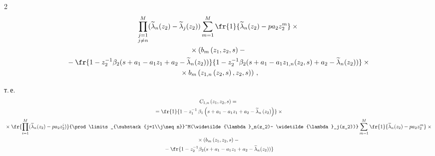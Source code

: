 \begin{multicols}{2}
\begin{multline*}
{\prod\limits_{\substack{j=1\\j\neq n}}^M(\widetilde{\lambda}_n(z_2)-


\widetilde{\lambda}_j(z_2))}


\sum\limits_{m=1}^M


\fr{1}{\widetilde{\lambda}_n(z_2)-pa_2 z_2^m}\times{}\\


{}\times\left(b_m\left(z_1,z_2,s\right)-{}\right.\\


{}-


\fr{1-z_2^{-1}\beta_2(s+a_1-a_1 z_1+a_2-\widetilde{\lambda}_n(z_2))}


{1-z_2^{-1}\beta_2(s+a_1-a_1 z_{1,n}(z_2,s)+a_2-\widetilde{\lambda}_n(z_2))}\times{}\\


\left.{}\times b_m\left(z_{1,n}\left(z_2,s\right),z_2,s\right)\right)\,,




\end{multline*}


т.\,е.\ \\[-17pt]


\begin{multline*}


C_{1,n}\left(z_1,z_2,s\right)={}\\


{}=


\fr{1}{1-z_1^{-1}\,\beta_1\left(s+a_1-a_1 z_1+a_2-


\widetilde{\lambda}_n\left(z_2\right)\right)}\times{}\\


{}\times


\fr{\prod\limits_{i=1}^M


(\widetilde{\lambda}_n(z_2)-pa_2 z_2^i)}


{\prod\limits_{\substack{j=1\\j\neq n}}^M(\widetilde{\lambda}_n(z_2)-


\widetilde{\lambda}_j(z_2))}


\sum\limits_{m=1}^M


\fr{1}{\widetilde{\lambda}_n(z_2)-pa_2 z_2^m}\times{}\\


{}\times\left( b_m\left(z_1,z_2,s\right)-{}\right.\\


{}-


\fr{1-z_2^{-1}\beta_2(s+a_1-a_1 z_1+a_2-\widetilde{\lambda}_n(z_2))}



\end{multline*}
\end{multicols}
